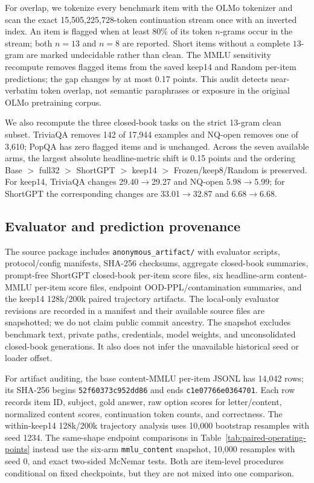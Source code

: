 For overlap, we tokenize every benchmark item with the OLMo tokenizer and scan
the exact 15,505,225,728-token continuation stream once with an inverted
index. An item is flagged when at least 80\% of its token $n$-grams occur in
the stream; both $n=13$ and $n=8$ are reported. Short items without a complete
$13$-gram are marked undecidable rather than clean. The MMLU sensitivity
recompute removes flagged items from the saved keep14 and Random per-item
predictions; the gap changes by at most 0.17 points. This audit detects
near-verbatim token overlap, not semantic paraphrases or exposure in the
original OLMo pretraining corpus.

We also recompute the three closed-book tasks on the strict 13-gram clean
subset. TriviaQA removes 142 of 17,944 examples and NQ-open removes one of
3,610; PopQA has zero flagged items and is unchanged. Across the seven available
arms, the largest absolute headline-metric shift is 0.15 points and the ordering
Base $>$ full32 $>$ ShortGPT $>$ keep14 $>$ Frozen/keep8/Random is preserved.
For keep14, TriviaQA changes 29.40$\rightarrow$29.27 and NQ-open
5.98$\rightarrow$5.99; for ShortGPT the corresponding changes are
33.01$\rightarrow$32.87 and 6.68$\rightarrow$6.68.

\subsection{Evaluator and prediction provenance}
The source package includes \texttt{anonymous\_artifact/} with evaluator
scripts, protocol/config manifests, SHA-256 checksums, aggregate closed-book
summaries, prompt-free ShortGPT closed-book per-item score files, six
headline-arm content-MMLU per-item score files, endpoint OOD-PPL/contamination
summaries, and the keep14 128k/200k paired trajectory artifacts. The local-only
evaluator revisions are
recorded in a manifest and their available source files are snapshotted; we do
not claim public commit ancestry. The snapshot excludes benchmark text, private
paths, credentials, model weights, and unconsolidated closed-book generations.
It also does not infer the unavailable historical seed or loader offset.

For artifact auditing, the base content-MMLU per-item JSONL has 14,042 rows;
its SHA-256 begins \texttt{52f60373c952dd86} and ends
\texttt{c1e07766e0364701}. Each row records
item ID, subject, gold answer, raw option scores for letter/content, normalized
content scores, continuation token counts, and correctness. The within-keep14
128k/200k trajectory analysis uses 10,000 bootstrap resamples with seed 1234.
The same-shape endpoint comparisons in
Table~\ref{tab:paired-operating-points} instead use the six-arm
\texttt{mmlu\_content} snapshot, 10,000 resamples with seed 0, and exact
two-sided McNemar tests. Both are item-level procedures conditional on fixed
checkpoints, but they are not mixed into one comparison.


